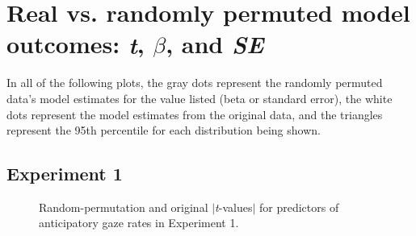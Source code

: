 \documentclass[authoryear, 12pt]{elsarticle}
\begin{document}



\appendix

\section{Real vs. randomly permuted model outcomes: \textit{t}, \textit{$\beta$}, and \textit{SE}}
\setcounter{figure}{0}  

In all of the following plots, the gray dots represent the randomly permuted data's model estimates for the value listed (beta or standard error), the white dots represent the model estimates from the original data, and the triangles represent the 95th percentile for each distribution being shown.

\subsection{Experiment 1}

\begin{figure}[!htb]
  \centering
  \hfill
  \caption{Random-permutation and original $|$\textit{t}-values$|$ for predictors of anticipatory gaze rates in Experiment 1.}
\end{figure}
\end{document}
